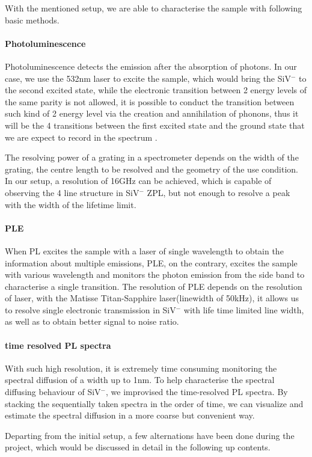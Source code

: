 With the mentioned setup, we are able to characterise the sample with following basic methods.


\paragraph{Photoluminescence} 
Photoluminescence detects the emission after the absorption of photons. In our case, we use the 532nm laser to excite the sample, which would bring the SiV$^{-}$ to the second excited state, while the electronic transition between 2 energy levels of the same parity is not allowed, it is possible to conduct the transition between such kind of 2 energy level via the creation and annihilation of phonons, thus it will be the 4 transitions between the first excited state and the ground state that we are expect to record in the spectrum .

The resolving power of a grating in a spectrometer depends on the width of the grating, the centre length to be resolved and the geometry of the use condition. In our setup, a resolution of 16GHz can be achieved, which is capable of observing the 4 line structure in SiV$^{-}$ ZPL, but not enough to resolve a peak with the width of the lifetime limit. 

\paragraph{PLE} When PL excites the sample with a laser of single wavelength to obtain the information about multiple emissions, PLE, on the contrary, excites the sample with various wavelength and monitors the photon emission from the side band to characterise a single transition. The resolution of PLE depends on the resolution of laser, with the Matisse Titan-Sapphire laser(linewidth of 50kHz), it allows us to resolve single electronic transmission in SiV$^{-}$ with life time limited line width, as well as to obtain better signal to noise ratio. 

\paragraph{time resolved PL spectra} With such high resolution, it is extremely time consuming monitoring the spectral diffusion of a width up to 1nm. To help characterise the spectral diffusing behaviour of SiV$^{-}$, we improvised the time-resolved PL spectra. By stacking the sequentially taken spectra in the order of time, we can visualize and estimate the spectral diffusion in a more coarse but convenient way.
 
Departing from the initial setup, a few alternations have been done during the project, which would be discussed in detail in the following up contents.